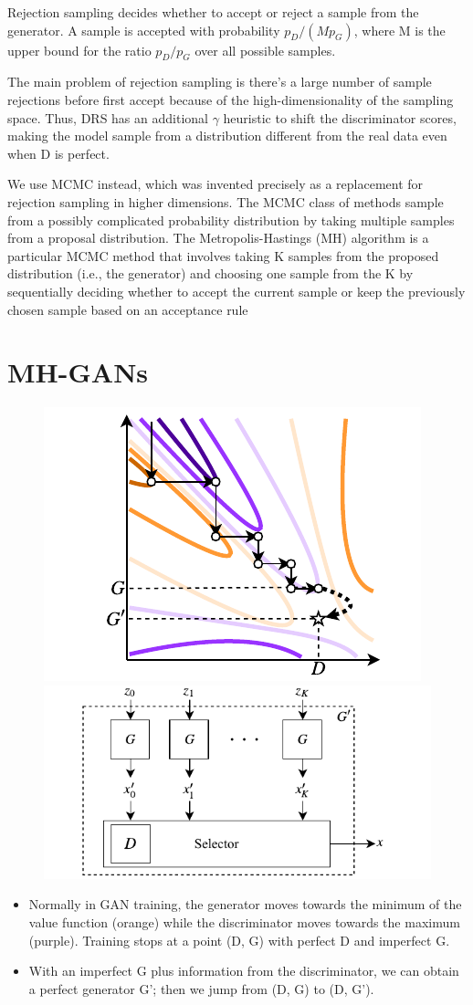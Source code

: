 \documentclass[a0,landscape]{a0poster}
\begin{document}
\begin{multicols}{3}
Rejection sampling decides whether to accept or reject a sample from the generator. A sample is accepted with probability $p_D/(Mp_G)$, where M is the upper bound for the ratio $p_D/p_G$ over all possible samples. 

The main problem of rejection sampling is there's a large number of sample rejections before first accept because of the high-dimensionality of the sampling space. Thus, DRS has an additional $\gamma$ heuristic to shift the discriminator scores, making the model sample from a distribution different from the real data even when D is perfect. 

We use MCMC instead, which was invented precisely as a replacement for rejection sampling in higher dimensions. The MCMC class of methods sample from a possibly complicated probability distribution by taking multiple samples from a proposal distribution. The Metropolis-Hastings (MH) algorithm is a particular MCMC method that involves taking K samples from the proposed distribution (i.e., the generator) and choosing one sample from the K by sequentially deciding whether to accept the current sample or keep the previously chosen sample based on an acceptance rule 

\section*{\fontsize{67.1}{82} \selectfont \color{NavyBlue} MH-GANs \color{Black}}
\begin{figure}[H]
\centering
\includegraphics[width=.1\textwidth]{../figures/coord_descent.pdf}
\includegraphics[width=.1\textwidth]{../figures/block_diag.pdf}
\end{figure}
\begin{itemize}
\item Normally in GAN training, the generator moves towards the minimum of the value function (orange) while the discriminator moves towards the maximum (purple). Training stops at a point (D, G) with perfect D and imperfect G. 

\item With an imperfect G plus information from the discriminator, we can obtain a perfect generator G’; then we jump from (D, G) to (D, G’). 


\end{itemize}
\end{multicols}
\end{document}
